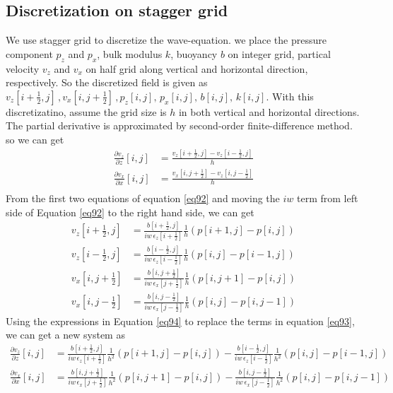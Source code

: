 \documentclass[revised,endfloat]{geophysics}
\begin{document}
\subsection{Discretization on stagger grid}
We use stagger grid to discretize the wave-equation. we place the pressure component $p_z$ and $p_x$, bulk modulus $k$, buoyancy $b$ on integer grid, partical velocity $v_z$ and $v_x$ on half grid along vertical and horizontal direction, respectively. So the discretized field is given as 
$v_z[i+\frac{1}{2},j]\,, v_x[i,j+\frac{1}{2}]\,,p_z[i,j],\, p_x[i,j],\, b[i,j],\, k[i,j] $. 
With this discretizatino, assume the grid size is $h$ in both vertical and horizontal directions. The partial derivative is approximated by second-order finite-difference method. so we can get
\begin{equation}
\begin{split}
\frac{\partial v_z}{\partial z}[i,j] &= \frac{v_z[i+\frac{1}{2},j] - v_z[i-\frac{1}{2},j]}{h} \\
\frac{\partial v_x}{\partial x}[i,j] &= \frac{v_x[i,j+\frac{1}{2}] - v_z[i,j-\frac{1}{2}]}{h} \\ 
\end{split}
\label{eq93}
\end{equation}
From the first two equations of equation \ref{eq92} and moving the $iw$ term from left side of Equation \ref{eq92} to the right hand side, we can get
\begin{equation}
\begin{split}
v_z[i+\frac{1}{2},j] &= \frac{b[i+\frac{1}{2},j]}{iw\, \epsilon_z[i+\frac{1}{2}]} \frac{1}{h}(p[i+1,j] - p[i,j]) \\
v_z[i-\frac{1}{2},j] &= \frac{b[i-\frac{1}{2},j]}{iw\, \epsilon_z[i-\frac{1}{2}]} \frac{1}{h}(p[i,j] - p[i-1,j]) \\
v_x[i,j+\frac{1}{2}] &= \frac{b[i,j+\frac{1}{2}]}{iw\, \epsilon_x[j+\frac{1}{2}]} \frac{1}{h}(p[i,j+1] - p[i,j]) \\
v_x[i,j-\frac{1}{2}] &= \frac{b[i,j-\frac{1}{2}]}{iw\, \epsilon_x[j-\frac{1}{2}]} \frac{1}{h}(p[i,j] - p[i,j-1])
\end{split}
\label{eq94}
\end{equation}
Using the expressions in Equation \ref{eq94} to replace the terms in equation \ref{eq93}, we can get a new system as 
\begin{equation}
\begin{split}
\frac{\partial v_z}{\partial z}[i,j] &=   \frac{b[i+\frac{1}{2},j]}{iw\, \epsilon_z[i+\frac{1}{2}]} \frac{1}{h^2}(p[i+1,j] - p[i,j]) - \frac{b[i-\frac{1}{2},j]}{iw\, \epsilon_z[i-\frac{1}{2}]} \frac{1}{h^2}(p[i,j] - p[i-1,j])\\
\frac{\partial v_x}{\partial x}[i,j] &= \frac{b[i,j+\frac{1}{2}]}{iw\, \epsilon_x[j+\frac{1}{2}]} \frac{1}{h^2}(p[i,j+1] - p[i,j])   -   \frac{b[i,j-\frac{1}{2}]}{iw\, \epsilon_x[j-\frac{1}{2}]} \frac{1}{h^2}(p[i,j] - p[i,j-1]) \\ 
\end{split}
\label{eq95}
\end{equation}
\end{document}
